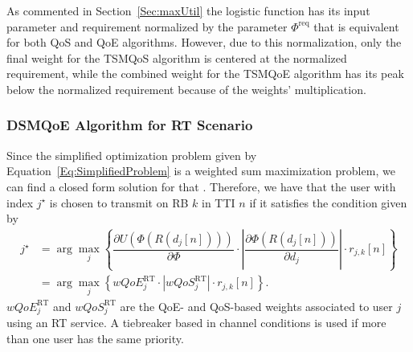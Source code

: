 \documentclass[12pt]{article}
\newcommand{\FigRef}[1]{Figure~\ref{#1}}
\newcommand{\SecRef}[1]{Section~\ref{#1}}
\newcommand{\EqRef}[1]{Equation~\ref{#1}}
\begin{document}

As commented in \SecRef{Sec:maxUtil} the logistic function has its input parameter and requirement normalized by the parameter $\Phi^{\mathrm{req}}$ that is equivalent for both QoS and QoE algorithms. However, due to this normalization, only the final weight for the TSMQoS algorithm is centered at the normalized requirement, while the combined weight for the TSMQoE algorithm has its peak below the normalized requirement because of the weights' multiplication. 


\subsubsection{DSMQoE Algorithm for \ac{RT} Scenario}
Since the simplified optimization problem given by \EqRef{Eq:SimplifiedProblem} is a weighted sum maximization problem, we can find a closed form solution for that \cite{Art:Song2005_p2,Proc:Hosein2002}. Therefore, we have that the user with index $j^\star$ is chosen to transmit on \ac{RB} $k$ in \ac{TTI} $n$ if it satisfies the condition given by
%
\begin{equation}
\label{Eq:argmaxDSMQoE}
\begin{split}
j^{\star} &= \arg\max_{j} \left\{\dfrac{\partial U\left(\Phi\left(R\left(d_j[n]\right)\right)\right)}{\partial \Phi} \cdot \left| \dfrac{\partial \Phi\left(R\left(d_j[n]\right)\right)}{\partial {d_j}} \right| \cdot r_{j,k}\left[n\right]\right\}\\ &= \arg\max_{j} \left\{wQoE_{j}^{\text{RT}}\cdot |wQoS_{j}^{\text{RT}}| \cdot r_{j,k}\left[n\right]\right\}.
\end{split}
\end{equation}
%
$wQoE_{j}^{\text{RT}}$ and $wQoS_{j}^{\text{RT}}$ are the QoE- and QoS-based weights associated to user $j$ using an \ac{RT} service. A tiebreaker based in channel conditions is used if more than one user has the same priority.
\end{document}
